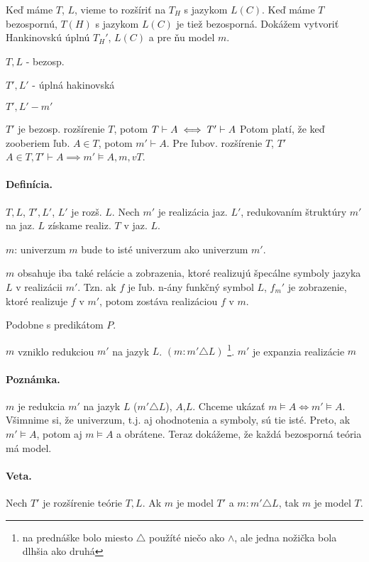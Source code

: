Keď máme $T$, $L$, vieme to rozšíriť na $T_H$ s jazykom $L(C)$. Keď máme $T$ bezospornú, $T(H)$ s jazykom $L(C)$ je tiež bezosporná. Dokážem vytvoriť Hankinovskú úplnú $T_H'$, $L(C)$ a pre ňu model $m$.

$T, L$ - bezosp.

$T', L'$ - úplná hakinovská

$T', L' - m'$

$T'$ je bezosp. rozšírenie $T$, potom $T \vdash A \iff T' \vdash A$ Potom platí, že keď zooberiem ľub. $A \in T$, potom  $m' \vdash A$. Pre ľubov. rozšírenie $T$, $T'$ $A\in T, T' \vdash A \implies m' \models A, m, v T$.

\paragraph{Definícia.}

$T,L$, $T',L'$, $L'$ je rozš. $L$. Nech $m'$ je realizácia jaz. $L'$, redukovaním štruktúry $m'$ na jaz. $L$ získame realiz. $T$ v jaz. $L$.

$m$: univerzum $m$ bude to isté univerzum ako univerzum $m'$.

$m$ obsahuje iba také relácie a zobrazenia, ktoré realizujú špecálne symboly jazyka $L$ v realizácii $m'$. Tzn. ak $f$ je ľub. n-ány funkčný symbol $L$, $f_m'$ je zobrazenie, ktoré realizuje $f$ v $m'$, potom zostáva realizáciou $f$ v $m$.

Podobne s predikátom $P$.

$m$ vzniklo redukciou $m'$ na jazyk $L$. $(m: m' \triangle L)$
\footnote{na prednáške bolo miesto $\triangle$ použíté niečo ako $\land$, ale jedna nožička bola dlhšia ako druhá}.
$m'$ je expanzia realizácie $m$

\paragraph{Poznámka.}
$m$ je redukcia $m'$ na jazyk $L$ ($m'\triangle L$), $A$,$L$. Chceme ukázať $m \models A \iff m' \models A$. Všimnime si, že univerzum, t.j. aj ohodnotenia a symboly, sú tie isté. Preto, ak $m' \models A$, potom aj $m \models A$ a obrátene. Teraz dokážeme, že každá bezosporná teória má model.

\paragraph{Veta.}
Nech $T'$ je rozšírenie teórie $T, L$. Ak $m$ je model $T'$ a $m:m'\triangle L$, tak $m$ je model $T$.

